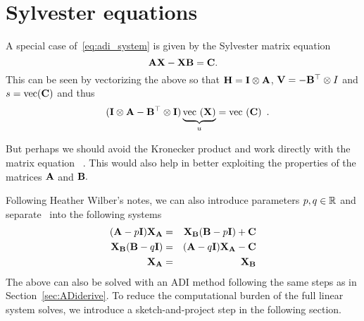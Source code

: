 \documentclass[10pt]{article}
\makeatletter
\renewcommand*{\eqref}[1]{%
  \hyperref[{#1}]{\textup{\tagform@{\ref*{#1}}}}%
}
\theoremstyle{definition}
\newcommand{\nid}[1]{\todo[inline]{\textbf{Nidham: }#1}}
\makeatother
\begin{document}
\section{Sylvester equations}

A special case of~\cref{eq:adi_system} is given by the Sylvester matrix equation
\begin{equation}
    \label{eq:sylvester}
    {\bf A} {\bf X} - {\bf X}{\bf B} = {\bf C}.
\end{equation}
This can be seen by vectorizing the above so that
 ${\bf H} = {\bf I} \otimes {\bf A}$, ${\bf V} = -{\bf B}^\top \otimes I$ and $s = \mbox{vec}({\bf C})$ and thus
\begin{equation*}
    \quad ({\bf I} \otimes {\bf A} - {\bf B}^\top \otimes {\bf I}) \underbrace{\mbox{vec } ({\bf X})}_{u} = \mbox{vec } ({\bf C}) \enspace.
\end{equation*}

But perhaps we should avoid the Kronecker product and work directly with the matrix equation~\eqref{eq:sylvester}. This would also help in better exploiting the properties of the matrices ${\bf A}$ and ${\bf B}.$

Following Heather Wilber's notes, we can also introduce parameters $p,q \in \mathbb{R}$ and separate~\eqref{eq:sylvester} into the following systems
\begin{eqnarray}
({\bf A} - p {\bf I}) {\bf X}_{{\bf A}} &=& {\bf X}_{{\bf B}}({\bf B} - p{\bf I}) + {\bf C} \label{eq:syspartA}\\
{\bf X}_{{\bf B}} ({\bf B} -q {\bf I}) &=& ({\bf A}-  q {\bf I}) {\bf X}_{{\bf A}} - {\bf C} \label{eq:syspartB} \\
{\bf X}_{{\bf A}} &=& {\bf X}_{{\bf B}}
\end{eqnarray}
The above can also be solved with an ADI method following the same steps as in Section~\ref{sec:ADiderive}. To reduce the computational burden of the full linear system solves, we introduce a sketch-and-project step in the following section.
\end{document}

